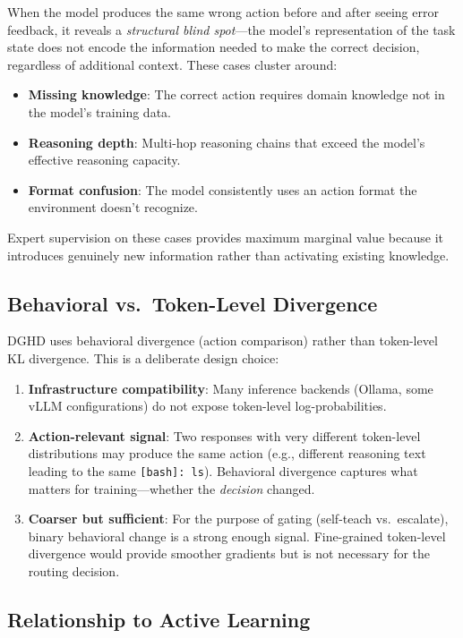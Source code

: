 \documentclass[11pt]{article}
\newcommand{\ours}{DGHD}
\begin{document}
When the model produces the same wrong action before and after seeing error feedback, it reveals a \emph{structural blind spot}---the model's representation of the task state does not encode the information needed to make the correct decision, regardless of additional context. These cases cluster around:

\begin{itemize}
    \item \textbf{Missing knowledge}: The correct action requires domain knowledge not in the model's training data.
    \item \textbf{Reasoning depth}: Multi-hop reasoning chains that exceed the model's effective reasoning capacity.
    \item \textbf{Format confusion}: The model consistently uses an action format the environment doesn't recognize.
\end{itemize}

Expert supervision on these cases provides maximum marginal value because it introduces genuinely new information rather than activating existing knowledge.

\subsection{Behavioral vs.\ Token-Level Divergence}

\ours{} uses behavioral divergence (action comparison) rather than token-level KL divergence. This is a deliberate design choice:

\begin{enumerate}
    \item \textbf{Infrastructure compatibility}: Many inference backends (Ollama, some vLLM configurations) do not expose token-level log-probabilities.
    \item \textbf{Action-relevant signal}: Two responses with very different token-level distributions may produce the same action (e.g., different reasoning text leading to the same \texttt{[bash]: ls}). Behavioral divergence captures what matters for training---whether the \emph{decision} changed.
    \item \textbf{Coarser but sufficient}: For the purpose of gating (self-teach vs.\ escalate), binary behavioral change is a strong enough signal. Fine-grained token-level divergence would provide smoother gradients but is not necessary for the routing decision.
\end{enumerate}

\subsection{Relationship to Active Learning}
\end{document}
